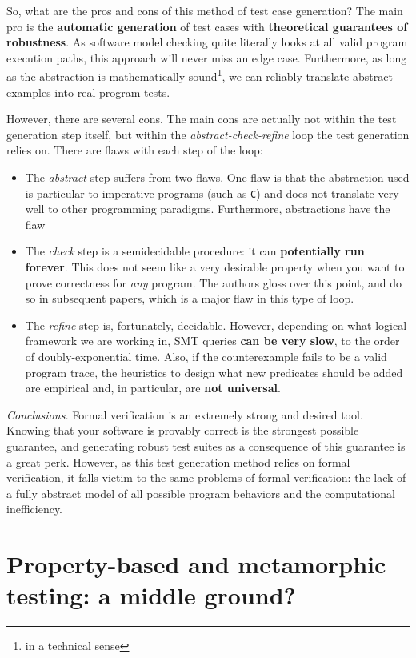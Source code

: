 \documentclass[acmsmall,review, nonacm]{acmart}
\begin{document}
So, what are the pros and cons of this method of test case generation? The main pro is the \textbf{automatic generation} of test cases with \textbf{theoretical guarantees of robustness}. As software model checking quite literally looks at all valid program execution paths, this approach will never miss an edge case. Furthermore, as long as the abstraction is mathematically sound\footnote{in a technical sense}, we can reliably translate abstract examples into real program tests. 

However, there are several cons. The main cons are actually not within the test generation step itself, but within the \textit{abstract-check-refine} loop the test generation relies on. There are flaws with each step of the loop:

\begin{itemize}
  \item The \textit{abstract} step suffers from two flaws. One flaw is that the abstraction used is particular to imperative programs (such as \texttt{C}) and does not translate very well to other programming paradigms. Furthermore, abstractions have the flaw 
  \item The \textit{check} step is a semidecidable procedure: it can \textbf{potentially run forever}. This does not seem like a very desirable property when you want to prove correctness for \textit{any} program. The authors gloss over this point, and do so in subsequent papers, which is a major flaw in this type of loop.
  \item The \textit{refine} step is, fortunately, decidable. However, depending on what logical framework we are working in, SMT queries \textbf{can be very slow}, to the order of doubly-exponential time. Also, if the counterexample fails to be a valid program trace, the heuristics to design what new predicates should be added are empirical and, in particular, are \textbf{not universal}.  
\end{itemize}

\textit{Conclusions.} Formal verification is an extremely strong and desired tool. Knowing that your software is provably correct is the strongest possible guarantee, and generating robust test suites as a consequence of this guarantee is a great perk. However, as this test generation method relies on formal verification, it falls victim to the same problems of formal verification: the lack of a fully abstract model of all possible program behaviors and the computational inefficiency. 

\section{Property-based and metamorphic testing: a middle ground?}
\end{document}
